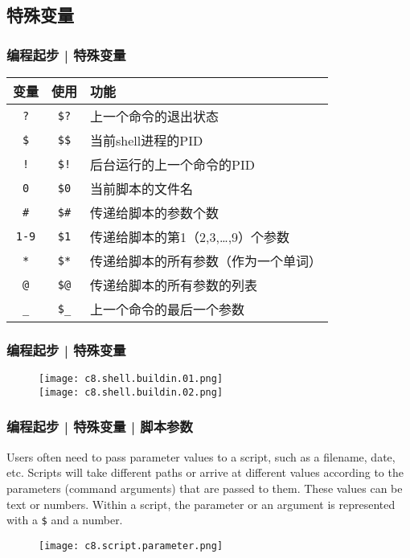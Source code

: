 \subsection{特殊变量}
\begin{frame}[fragile]
  \frametitle{编程起步 | \alert{特殊变量}}
  \begin{table}
    \centering
    \begin{tabularx}{0.8\textwidth}{ccX}
      \hline
      \rowcolor{blue!50}变量 & 使用 & 功能\\
      \hline
      \verb|?| & \verb|$?| & 上一个命令的退出状态\\
      \verb|$| & \verb|$$| & 当前shell进程的PID\\
      \verb|!| & \verb|$!| & 后台运行的上一个命令的PID\\
      \verb|0| & \verb|$0| & 当前脚本的文件名\\
      \verb|#| & \verb|$#| & 传递给脚本的参数个数\\
      \verb|1-9| & \verb|$1| & 传递给脚本的第1（2,3,\ldots,9）个参数\\
      \verb|*| & \verb|$*| & 传递给脚本的所有参数（作为一个单词）\\
      \verb|@| & \verb|$@| & 传递给脚本的所有参数的列表\\
      \verb|_| & \verb|$_| & 上一个命令的最后一个参数\\
      \hline
    \end{tabularx}
  \end{table}
\end{frame}

\begin{frame}
  \frametitle{编程起步 | 特殊变量}
  \begin{figure}
    \centering
    \texttt{[image: c8.shell.buildin.01.png]}\\
    \texttt{[image: c8.shell.buildin.02.png]}
  \end{figure}
\end{frame}

\begin{frame}[fragile]
  \frametitle{编程起步 | 特殊变量 | 脚本参数}
  Users often need to pass parameter values to a script, such as a filename, date, etc. Scripts will take different paths or arrive at different values according to the parameters (command arguments) that are passed to them. These values can be text or numbers. Within a script, the parameter or an argument is represented with a \verb|$| and a number.
  \begin{figure}
    \centering
    \texttt{[image: c8.script.parameter.png]}
  \end{figure}
\end{frame}

